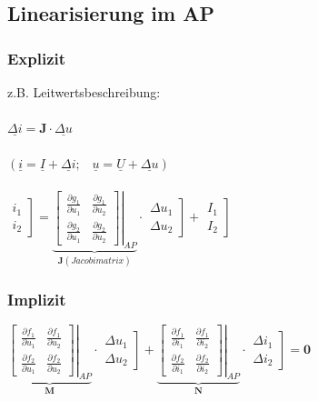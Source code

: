 \documentclass[a4paper,twocolumn,10pt]{article}
\begin{document}
\subsection*{Linearisierung im AP}
\subsubsection*{Explizit}
z.B. Leitwertsbeschreibung:\\\\
$\underline{\Delta i}=\textbf{J}\cdot \underline{\Delta u}$\\\\
$(\underline{i}=\underline{I}+\underline{\Delta i};\;\;\;\underline{u}=\underline{U}+\underline{\Delta u})$\\\\
$\left.\begin{matrix}i_1\\ i_2\end{matrix}\right]=\underbrace{\left.\begin{bmatrix}\frac{\partial g_1}{\partial u_1} & \frac{\partial g_1}{\partial u_2}\\ \frac{\partial g_2}{\partial u_1} & \frac{\partial g_2}{\partial u_2}\end{bmatrix}\right|_{AP}}_{\textbf{J} (Jacobimatrix)}\cdot \left.\begin{matrix}\Delta u_1\\ \Delta u_2\end{matrix}\right]+\left.\begin{matrix}I_1\\ I_2\end{matrix}\right]$
\subsubsection*{Implizit}
$\underbrace{\left.\begin{bmatrix}\frac{\partial f_1}{\partial u_1} & \frac{\partial f_1}{\partial u_2}\\ \frac{\partial f_2}{\partial u_1} & \frac{\partial f_2}{\partial u_2}\end{bmatrix}\right|_{AP}}_{\textbf{M}}\cdot \left.\begin{matrix}\Delta u_1\\ \Delta u_2\end{matrix}\right]+ \underbrace{\left.\begin{bmatrix}\frac{\partial f_1}{\partial i_1} & \frac{\partial f_1}{\partial i_2}\\ \frac{\partial f_2}{\partial i_1} & \frac{\partial f_2}{\partial i_2}\end{bmatrix}\right|_{AP}}_{\textbf{N}}\cdot \left.\begin{matrix}\Delta i_1\\ \Delta i_2\end{matrix}\right]=\textbf{0}$
\end{document}
